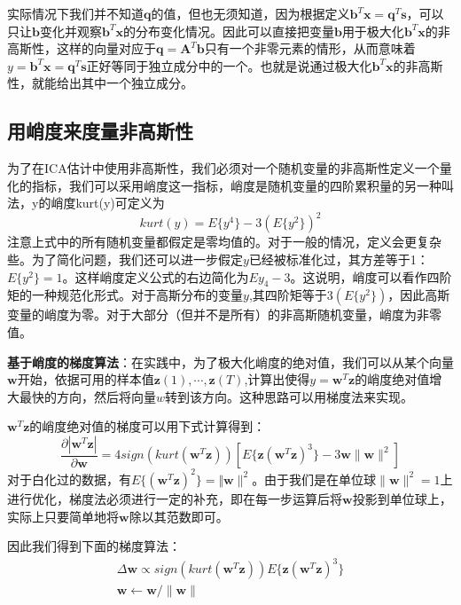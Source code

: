 实际情况下我们并不知道$\mathbf{q}$的值，但也无须知道，因为根据定义$\mathbf{b}^T\mathbf{x}=\mathbf{q}^T\mathbf{s}$，可以只让$\mathbf{b}$变化并观察$\mathbf{b}^T\mathbf{x}$的分布变化情况。因此可以直接把变量$\mathbf{b}$用于极大化$\mathbf{b}^T\mathbf{x}$的非高斯性，这样的向量对应于$\mathbf{q}=\mathbf{A}^T\mathbf{b}$只有一个非零元素的情形，从而意味着$ y=\mathbf{b}^T\mathbf{x}=\mathbf{q}^T\mathbf{s}$正好等同于独立成分中的一个。也就是说通过极大化$\mathbf{b}^T\mathbf{x}$的非高斯性，就能给出其中一个独立成分。



\subsection{用峭度来度量非高斯性}
为了在ICA估计中使用非高斯性，我们必须对一个随机变量的非高斯性定义一个量化的指标，我们可以采用峭度这一指标，峭度是随机变量的四阶累积量的另一种叫法，y的峭度kurt(y)可定义为
\begin{equation}
kurt(y)=E\{y^4\}-3(E\{y^2\})^2
\end{equation}
注意上式中的所有随机变量都假定是零均值的。对于一般的情况，定义会更复杂些。为了简化问题，我们还可以进一步假定$y$已经被标准化过，其方差等于1：$E\{y^2\}=1$。这样峭度定义公式的右边简化为$E{y_4}-3$。这说明，峭度可以看作四阶矩的一种规范化形式。对于高斯分布的变量$y$,其四阶矩等于$3(E\{y^2\})$，因此高斯变量的峭度为零。对于大部分（但并不是所有）的非高斯随机变量，峭度为非零值。

\textbf{基于峭度的梯度算法}：在实践中，为了极大化峭度的绝对值，我们可以从某个向量$\mathbf{w}$开始，依据可用的样本值$\mathbf{z}(1),\cdots,\mathbf{z}(T)$,计算出使得$y=\mathbf{w}^T\mathbf{z}$的峭度绝对值增大最快的方向，然后将向量$w$转到该方向。这种思路可以用梯度法来实现。

$\mathbf{w}^T\mathbf{z}$的峭度绝对值的梯度可以用下式计算得到：
\begin{equation}
\frac{\partial| \mathbf{w}^T\mathbf{z} |}{\partial \mathbf{w}}
=4sign( kurt( \mathbf{w}^T\mathbf{z} ) ) [ E\{ \mathbf{z}(\mathbf{w}^T\mathbf{z})^3 \} - 3 \mathbf{w} \lVert \mathbf{w} \rVert^2 ]  \label{equ:wzw}
\end{equation}
对于白化过的数据，有$E\{ (\mathbf{w}^T\mathbf{z})^2 \}= \Vert \mathbf{w} \rVert^2$。由于我们是在单位球$\lVert \mathbf{w} \rVert^2=1$上进行优化，梯度法必须进行一定的补充，即在每一步运算后将$\mathbf{w}$投影到单位球上，实际上只要简单地将$\mathbf{w}$除以其范数即可。

因此我们得到下面的梯度算法：
\begin{align}
\Delta\mathbf{w} \propto sign( kurt( \mathbf{w}^T\mathbf{z} ) ) E\{ \mathbf{z}( \mathbf{w}^T\mathbf{z} )^3 \} \\
\mathbf{w}\leftarrow \mathbf{w}/\lVert\mathbf{w}\rVert
\end{align}

